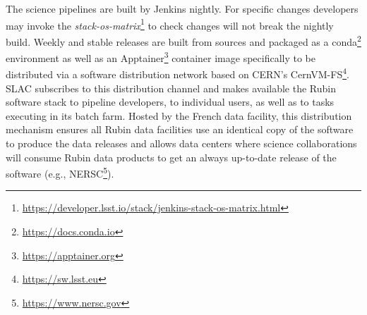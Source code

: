 The science pipelines are built by Jenkins nightly.\cite{2018SPIE10707E..09J}
For specific changes developers may invoke the \emph{stack-os-matrix}\footnote{\url{https://developer.lsst.io/stack/jenkins-stack-os-matrix.html}} to check changes will not break the nightly build. Weekly and stable releases are built from sources and packaged as a conda\footnote{\url{https://docs.conda.io}} environment as well as an Apptainer\footnote{\url{https://apptainer.org}} container image specifically to be distributed via a software distribution network based on CERN's CernVM-FS\footnote{\url{https://sw.lsst.eu}}. SLAC subscribes to this distribution channel and makes available the Rubin software stack to pipeline developers, to individual users, as well as to tasks executing in its batch farm. Hosted by the French data facility, this distribution mechanism ensures all Rubin data facilities use an identical copy of the software to produce the data releases and allows data centers where science collaborations will consume Rubin data products to get an always up-to-date release of the software (e.g., NERSC\footnote{\url{https://www.nersc.gov}}).
